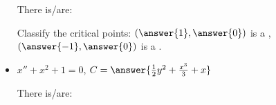 \documentclass{ximera}
\begin{document}
\begin{exercise}
\begin{itemize}
            \begin{problem}
                There is/are:
                \begin{multipleChoice}
                \end{multipleChoice}
                \begin{problem}
                    Classify the critical points: $\left(\answer{1}, \answer{0}\right)$ is a , $\left(\answer{-1}, \answer{0}\right)$ is a .
                \end{problem}
            \end{problem}
        \item $x''+ x^2+1 = 0$, $C = \answer{\frac{1}{2}y^2 + \frac{x^3}{3} + x}$
            \begin{problem}
                There is/are:
                \begin{multipleChoice}
                \end{multipleChoice}
            \end{problem}
    \end{itemize}
\end{exercise}
\end{document}
